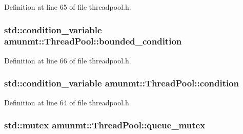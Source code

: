 Definition at line 65 of file threadpool.\+h.

\subsubsection[{\texorpdfstring{bounded\+\_\+condition}{bounded_condition}}]{\setlength{\rightskip}{0pt plus 5cm}std\+::condition\+\_\+variable amunmt\+::\+Thread\+Pool\+::bounded\+\_\+condition\hspace{0.3cm}{\ttfamily [private]}}\hypertarget{classamunmt_1_1ThreadPool_ade8c762e453107fd5e3e3097be95732e}{}\label{classamunmt_1_1ThreadPool_ade8c762e453107fd5e3e3097be95732e}


Definition at line 66 of file threadpool.\+h.

\subsubsection[{\texorpdfstring{condition}{condition}}]{\setlength{\rightskip}{0pt plus 5cm}std\+::condition\+\_\+variable amunmt\+::\+Thread\+Pool\+::condition\hspace{0.3cm}{\ttfamily [private]}}\hypertarget{classamunmt_1_1ThreadPool_a2f3b5194456806a842817062870b4907}{}\label{classamunmt_1_1ThreadPool_a2f3b5194456806a842817062870b4907}


Definition at line 64 of file threadpool.\+h.

\subsubsection[{\texorpdfstring{queue\+\_\+mutex}{queue_mutex}}]{\setlength{\rightskip}{0pt plus 5cm}std\+::mutex amunmt\+::\+Thread\+Pool\+::queue\+\_\+mutex\hspace{0.3cm}{\ttfamily [private]}}\hypertarget{classamunmt_1_1ThreadPool_a4b1865f03dab554b2e933dfe6f662f48}{}\label{classamunmt_1_1ThreadPool_a4b1865f03dab554b2e933dfe6f662f48}



